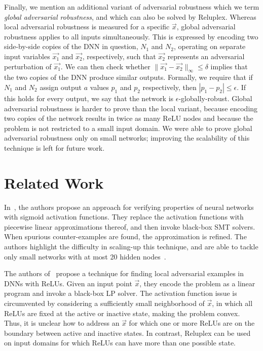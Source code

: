 \documentclass[a4paper]{llncs}
\begin{document}
Finally, we mention an additional variant of adversarial robustness
which we term \emph{global adversarial robustness}, and which can also be
solved by Reluplex.
Whereas local adversarial robustness is measured for a specific
$\vec{x}$, global adversarial robustness
applies to all inputs simultaneously.
This is expressed by encoding two side-by-side copies of the DNN
in question, $N_1$ and $N_2$, operating on separate input variables
$\vec{x_1}$ and $\vec{x_2}$, respectively,
such that $\vec{x_2}$ represents an adversarial perturbation of
$\vec{x_1}$.
%
We can then check whether 
$\| \vec{x_1} - \vec{x_2}\|_{\infty}\leq \delta$ implies that the two copies of the DNN
produce similar outputs.
Formally, we require that 
if $N_1$ and $N_2$ assign output $a$
values $p_1$ and $p_2$ respectively, then $|p_1-p_2|\leq \epsilon$. 
If this holds for every output, we say that the network
is $\epsilon$-globally-robust.  Global
adversarial robustness is harder to prove than the local variant,
because encoding two copies of the network results in twice as many ReLU
nodes and because the problem is not restricted to a small input
domain.
 We were able to prove global adversarial robustness only on
small networks; improving the scalability of this technique is left
for future work.


\section{Related Work}
\label{sec:relatedWork}

In~\cite{PuTa10}, the authors propose an
approach for verifying properties of neural networks with
sigmoid activation functions. They replace the
activation functions with piecewise linear approximations thereof, and then
invoke black-box SMT solvers. When spurious
counter-examples are found,
the approximation is refined.
The authors highlight the difficulty in scaling-up
this technique, and are able to tackle only small networks with at
most 20 hidden nodes~\cite{PuTa12}.

The authors of~\cite{BaIoLaVyNoCr16} propose a technique for finding
local adversarial examples in DNNs with ReLUs. Given an input point $\vec{x}$,
they encode the problem as a linear program and invoke a black-box LP
solver. 
The activation function issue is circumvented by
considering a sufficiently small neighborhood of $\vec{x}$, in which
all ReLUs are fixed at the active or inactive state, 
 making the problem convex. Thus, it is unclear how to
address an $\vec{x}$ for which one or more ReLUs are
on the boundary between active and inactive states.
 In contrast, Reluplex can be used on input domains for which ReLUs can
 have more than one possible state.
\end{document}
